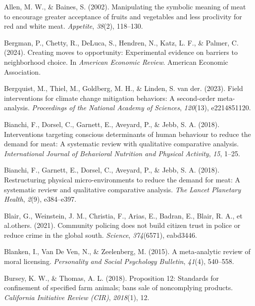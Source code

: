 \documentclass[
  man]{apa6}
\newlength{\cslhangindent}
\newenvironment{CSLReferences}[2] %
 {\begin{list}{}{%
  \setlength{\itemindent}{0pt}
  \setlength{\leftmargin}{0pt}
  \setlength{\parsep}{0pt}
  \ifodd #1
   \setlength{\leftmargin}{\cslhangindent}
   \setlength{\itemindent}{-1\cslhangindent}
  \fi
  \setlength{\itemsep}{#2\baselineskip}}}
 {\end{list}}
\begin{document}
\label{refs}
\begin{CSLReferences}{1}{0}
Allen, M. W., \& Baines, S. (2002). Manipulating the symbolic meaning of meat to encourage greater acceptance of fruits and vegetables and less proclivity for red and white meat. \emph{Appetite}, \emph{38}(2), 118--130.

Bergman, P., Chetty, R., DeLuca, S., Hendren, N., Katz, L. F., \& Palmer, C. (2024). Creating moves to opportunity: Experimental evidence on barriers to neighborhood choice. In \emph{American Economic Review}. American Economic Association.

Bergquist, M., Thiel, M., Goldberg, M. H., \& Linden, S. van der. (2023). Field interventions for climate change mitigation behaviors: A second-order meta-analysis. \emph{Proceedings of the National Academy of Sciences}, \emph{120}(13), e2214851120.

Bianchi, F., Dorsel, C., Garnett, E., Aveyard, P., \& Jebb, S. A. (2018). Interventions targeting conscious determinants of human behaviour to reduce the demand for meat: A systematic review with qualitative comparative analysis. \emph{International Journal of Behavioral Nutrition and Physical Activity}, \emph{15}, 1--25.

Bianchi, F., Garnett, E., Dorsel, C., Aveyard, P., \& Jebb, S. A. (2018). Restructuring physical micro-environments to reduce the demand for meat: A systematic review and qualitative comparative analysis. \emph{The Lancet Planetary Health}, \emph{2}(9), e384--e397.

Blair, G., Weinstein, J. M., Christia, F., Arias, E., Badran, E., Blair, R. A., et al.others. (2021). Community policing does not build citizen trust in police or reduce crime in the global south. \emph{Science}, \emph{374}(6571), eabd3446.

Blanken, I., Van De Ven, N., \& Zeelenberg, M. (2015). A meta-analytic review of moral licensing. \emph{Personality and Social Psychology Bulletin}, \emph{41}(4), 540--558.

Bursey, K. W., \& Thomas, A. L. (2018). Proposition 12: Standards for confinement of specified farm animals; bans sale of noncomplying products. \emph{California Initiative Review (CIR)}, \emph{2018}(1), 12.


\end{CSLReferences}
\end{document}
